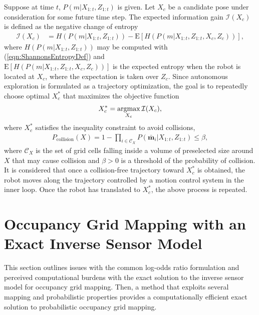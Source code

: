 \documentclass[smallextended]{svjour3}       %
\newcommand{\refeqn}[1]{(\ref{eqn:#1})}
\newcommand{\argmax}{\operatornamewithlimits{argmax}}
\begin{document}
Suppose at time $t$, $P(m|X_{1:t},Z_{1:t})$ is given. Let $X_c$ be a candidate pose under consideration for some future time step.
The expected information gain $\mathcal I(X_c)$ is defined as the negative change of entropy
\begin{align}
\label{eqn:ObjFun}
\mathcal I(X_c)&=H(P(m|X_{1:t},Z_{1:t}))%
-\text{E}\left[H(P(m|X_{1:t},Z_{1:t},X_c,Z_c))\right],
\end{align}
where $H(P(m|X_{1:t},Z_{1:t}))$ may be computed with \refeqn{ShannonsEntropyDef} and \\$\text{E}\left[H(P(m|X_{1:t},Z_{1:t},X_c,Z_c))\right]$ is the expected entropy when the robot is located at $X_c$, where the expectation is taken over $Z_c$.
Since autonomous exploration is formulated as a trajectory optimization, the goal is to repeatedly choose optimal $X_c^*$ that maximizes the objective function
\begin{align}
\label{eqn:Objective}
X_c^*=\argmax_{X_c}{\mathcal I(X_c)},
\end{align}
where $X_c^*$ satisfies the inequality constraint to avoid collisions,
\begin{align}
\label{eqn:CollisionInequalityConstraint}
P_\text{collision}(X)=1-\prod_{i\in\mathcal C_X}P(\bar{\mathbf{m}}_i|X_{1:t},Z_{1:t})\leq\beta,
\end{align}
where $\mathcal C_X$ is the set of grid cells falling inside a volume of preselected size around $X$ that may cause collision and $\beta>0$ is a threshold of the probability of collision. It is considered that once a collision-free trajectory toward $X_c^*$ is obtained, the robot moves along the trajectory controlled by a motion control system in the inner loop. Once the robot has translated to $X_c^*$, the above process is repeated.








\section{Occupancy Grid Mapping with an Exact Inverse Sensor Model}
\label{sec:ISM}

This section outlines issues with the common log-odds ratio formulation and perceived computational burdens with the exact solution to the inverse sensor model for occupancy grid mapping. Then, a method that exploits several mapping and probabilistic properties provides a computationally efficient exact solution to probabilistic occupancy grid mapping.
\end{document}
